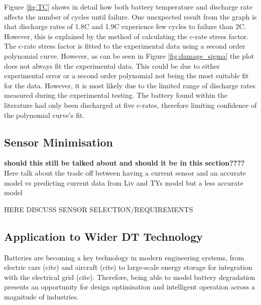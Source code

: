 \documentclass[a4paper, 10pt]{article}
\numberwithin{equation}{section}
\begin{document}
Figure \ref{fig:TC} shows in detail how both battery temperature and discharge rate affects the number of cycles until failure. One unexpected result from the graph is that discharge rates of 1.8C and 1.9C experience few cycles to failure than 2C. However, this is explained by the method of calculating the c-rate stress factor. The c-rate stress factor is fitted to the experimental data using a second order polynomial curve. However, as can be seen in Figure \ref{fig:damage_sigma} the plot does not always fit the experimental data. This could be due to either experimental error or a second order polynomial not being the most suitable fit for the data. However, it is most likely due to the limited range of discharge rates measured during the experimental testing. The battery found within the literature had only been discharged at five c-rates, therefore limiting confidence of the polynomial curve's fit.

\FloatBarrier
\subsection{Sensor Minimisation}
\textbf{should this still be talked about and should it be in this section????}
Here talk about the trade off between having a current sensor and an accurate model vs predicting current data from Liv and TYs model but a less accurate model

HERE DISCUSS SENSOR SELECTION/REQUIREMENTS

\subsection{Application to Wider DT Technology}



Batteries are becoming a key technology in modern engineering systems, from electric cars (cite) and aircraft (cite) to large-scale energy storage for integration with the electrical grid (cite). Therefore, being able to model battery degradation presents an opportunity for design optimisation and intelligent operation across a magnitude of industries.
\end{document}

